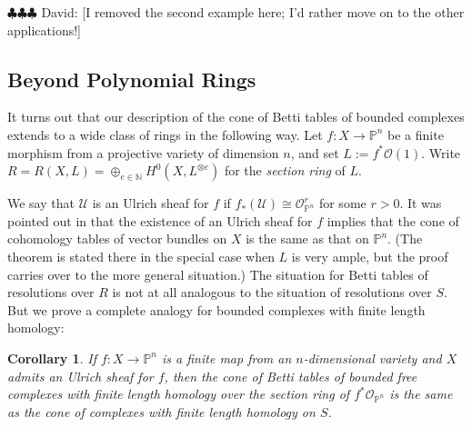 \documentclass[12pt]{amsart}
\newtheorem{cor}[lemma]{Corollary}
\theoremstyle{definition}
\theoremstyle{remark}
\newcommand{\codim}{\operatorname{codim}}
\newcommand{\PP}{\mathbb{P}}
\newcommand{\QQ}{\mathbb{Q}}
\newcommand{\cO}{\mathcal{O}}
\newcommand{\cU}{\mathcal{U}}
\newcommand{\FF}{\mathbf{F}}
\newcommand{\defi}[1]{\textsf{#1}} %
\newcommand{\DD}{\mathrm{D}}
\newcommand{\daniel}[1]{{\color{green} \sf $\clubsuit\clubsuit\clubsuit$ Daniel: [#1]}}
\newcommand{\david}[1]{{\color{red} \sf $\clubsuit\clubsuit\clubsuit$ David: [#1]}}
\renewcommand{\P}{{\mathbb P}}
\begin{document}
\david{I removed the second example here; I'd rather move on to the other applications!}
%
\subsection*{Beyond Polynomial Rings}
It turns out that our description of the cone of Betti tables of bounded complexes
extends to a wide class of rings in the following way. Let $f:X\to \PP^{n}$ be a finite
morphism from a projective variety of dimension $n$, and set $L:=f^*\cO(1)$. 
Write $R=R(X,L)=\oplus_{e\in \mathbb N} H^0(X,L^{\otimes e})$ for the \emph{section ring}
of $L$.

We say that $\cU$ is an \defi{Ulrich sheaf} for $f$ if $f_*(\cU)\cong \cO_{\PP^n}^r$ for some $r>0$.  It was pointed out in \cite[Theorem~5]{eis-schrey-abel} that the existence of an Ulrich sheaf for $f$ implies that  the cone of cohomology tables of vector bundles on $X$ is the same as that on $\PP^{n}$. (The theorem is stated there in the special case when $L$ is very ample, but the proof
carries over to the more general situation.) The situation for Betti tables of resolutions over $R$ is not at all analogous to the situation of resolutions over $S$. But we prove a complete analogy for bounded complexes with finite length homology:

\begin{cor}\label{cor:isom cones}
If $f:X\to \P^{n}$ is a  finite map from an $n$-dimensional variety and $X$ admits an Ulrich sheaf for $f$, then the cone of Betti tables
of bounded free complexes with finite length homology over  the section ring
of $f^{*}\cO_{\P^{n}}$ is the same
as the cone of complexes with finite length homology  on $S$. 
\end{cor}
\end{document}
